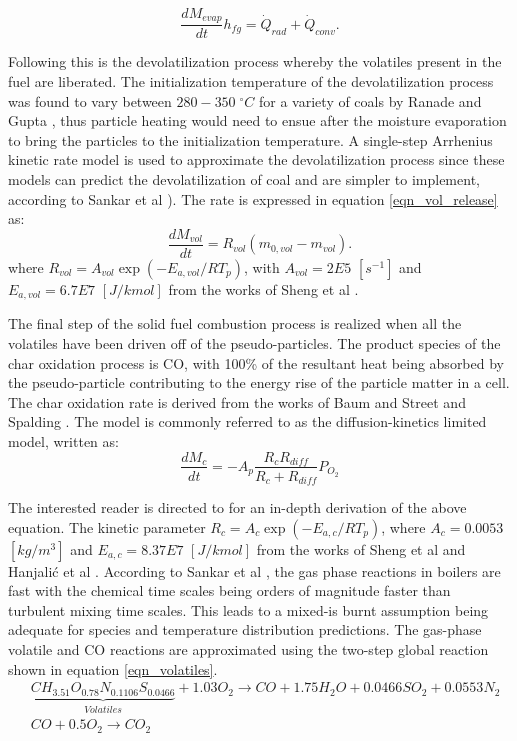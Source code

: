 \documentclass{webofc}
\begin{document}
\begin{equation}\label{eqn_evap_release}
\frac{dM_{evap}}{dt}h_{fg}=\dot{Q}_{rad} + \dot{Q}_{conv}.
\end{equation}

Following this is the devolatilization process whereby the volatiles present in the fuel are liberated. The initialization temperature of the devolatilization process was found to vary between $280 - 350\;^{\circ}C$ for a variety of coals by Ranade and Gupta \cite{gupta}, thus particle heating would need to ensue after the moisture evaporation to bring the particles to the initialization temperature. A single-step Arrhenius kinetic rate model is used to approximate the devolatilization process since these models can predict the devolatilization of coal and are simpler to implement, according to Sankar et al \cite{sankar}). The rate is expressed in equation \ref{eqn_vol_release} as:\\
\begin{equation}\label{eqn_vol_release}
\frac{dM_{vol}}{dt}=R_{vol}(m_{0,vol}-m_{vol}).
\end{equation}
where $R_{vol} = A_{vol} \exp(-E_{a,vol} / R T_p)$, with $A_{vol} = 2E5$ $[s^{-1}]$ and $E_{a,vol} = 6.7E7$ $[J/kmol]$  from the works of Sheng et al \cite{sheng}. %

The final step of the solid fuel combustion process is realized when all the volatiles have been driven off of the pseudo-particles. The product species of the char oxidation process is CO, with 100\% of the resultant heat being absorbed by the pseudo-particle contributing to the energy rise of the particle matter in a cell. The char oxidation rate is derived from the works of Baum and Street \cite{baum} and Spalding \cite{spalding}. The model is commonly referred to as the diffusion-kinetics limited model, written as:
\begin{equation}\label{eqn_char_release}
\frac{dM_c}{dt}=-A_{p}\frac{R_{c}R_{diff}}{R_{c}+R_{diff}}P_{O_{2}}
\end{equation}

The interested reader is directed to \cite{ansys} for an in-depth derivation of the above equation. The kinetic parameter $R_{c} = A_{c} \exp(-E_{a,c} / R T_p)$, where $A_c = 0.0053$ $[kg/m^3]$ and $E_{a,c} = 8.37E7$ $[J/kmol]$ from the works of Sheng et al \cite{sheng} and Hanjalić et al \cite{han}. According to Sankar et al \cite{sankar}, the gas phase reactions in boilers are fast with the chemical time scales being orders of magnitude faster than turbulent mixing time scales. This leads to a mixed-is burnt assumption being adequate for species and temperature distribution predictions. The gas-phase volatile and CO reactions are approximated using the two-step global reaction shown in equation \ref{eqn_volatiles}. 
\begin{equation}\label{eqn_volatiles}
\begin{split}
&\underbrace{CH_{3.51}O_{0.78}N_{0.1106}S_{0.0466}}_{Volatiles}+1.03O_2\to CO + 1.75H_2O + 0.0466SO_{2} + 0.0553N_2\\
&CO + 0.5O_2\to CO_2
\end{split}
\end{equation}
\end{document}
